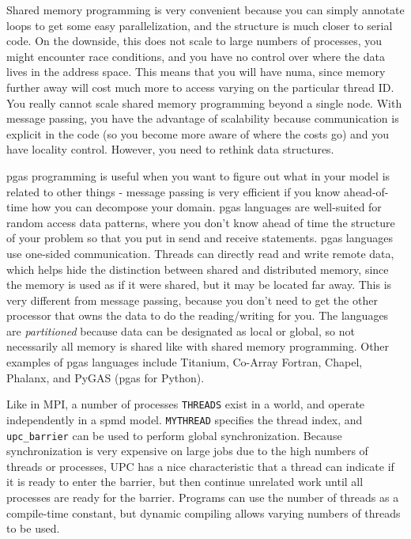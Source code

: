 \documentclass[10pt]{article}
\begin{document}
\begin{flushleft}
Shared memory programming is very convenient because you can simply annotate loops to get some easy parallelization, and the structure is much closer to serial code. On the downside, this does not scale to large numbers of processes, you might encounter race conditions, and you have no control over where the data lives in the address space. This means that you will have \gls{numa}, since memory further away will cost much more to access varying on the particular thread ID. You really cannot scale shared memory programming beyond a single node. With message passing, you have the advantage of scalability because communication is explicit in the code (so you become more aware of where the costs go) and you have locality control. However, you need to rethink data structures. 

\gls{pgas} programming is useful when you want to figure out what in your model is related to other things - message passing is very efficient if you know ahead-of-time how you can decompose your domain. \gls{pgas} languages are well-suited for random access data patterns, where you don't know ahead of time the structure of your problem so that you put in send and receive statements. \gls{pgas} languages use one-sided communication. Threads can directly read and write remote data, which helps hide the distinction between shared and distributed memory, since the memory is used as if it were shared, but it may be located far away. This is very different from message passing, because you don't need to get the other processor that owns the data to do the reading/writing for you. The languages are \textit{partitioned} because data can be designated as local or global, so not necessarily all memory is shared like with shared memory programming. Other examples of \gls{pgas} languages include Titanium, Co-Array Fortran, Chapel, Phalanx, and PyGAS (\gls{pgas} for Python).  

Like in MPI, a number of processes {\tt THREADS} exist in a world, and operate independently in a \gls{spmd} model. {\tt MYTHREAD} specifies the thread index, and {\tt upc\_barrier} can be used to perform global synchronization. Because synchronization is very expensive on large jobs due to the high numbers of threads or processes, UPC has a nice characteristic that a thread can indicate if it is ready to enter the barrier, but then continue unrelated work until all processes are ready for the barrier. Programs can use the number of threads as a compile-time constant, but dynamic compiling allows varying numbers of threads to be used. 


\end{flushleft}
\end{document}
